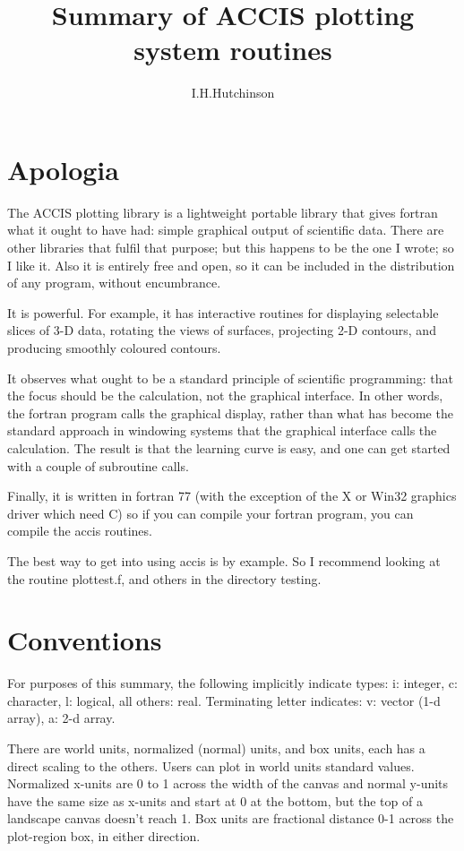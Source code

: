 \documentclass[12pt]{article}
\title{Summary of ACCIS plotting system routines}
\author{I.H.Hutchinson}
\date{}
\begin{document}
\maketitle

\tableofcontents

\section{Apologia}

The ACCIS plotting library is a lightweight portable library that
gives fortran what it ought to have had: simple graphical output of
scientific data. There are other libraries that fulfil that purpose;
but this happens to be the one I wrote; so I like it. Also it is
entirely free and open, so it can be included in the distribution of
any program, without encumbrance. 

It is powerful. For example, it has interactive routines for
displaying selectable slices of 3-D data, rotating the views of
surfaces, projecting 2-D contours, and producing smoothly coloured
contours.

It observes what ought to be a standard principle of scientific
programming: that the focus should be the calculation, not the
graphical interface. In other words, the fortran program calls the
graphical display, rather than what has become the standard approach
in windowing systems that the graphical interface calls the
calculation. The result is that the learning curve is easy, and one
can get started with a couple of subroutine calls.

Finally, it is written in fortran 77 (with the exception of the X or
Win32 graphics driver which need C) so if you can compile your
fortran program, you can compile the accis routines.

The best way to get into using accis is by example. So I recommend
looking at the routine plottest.f, and others in the directory testing.

\section{Conventions}

For purposes of this summary, the following implicitly indicate types:
i: integer, c: character, l: logical, all others: real.  Terminating
letter indicates: v: vector (1-d array), a: 2-d array.  

There are world units, normalized (normal) units, and box units, each
has a direct scaling to the others. Users can plot in world units
standard values. Normalized x-units are 0 to 1 across the width of the
canvas and normal y-units have the same size as x-units and start at 0
at the bottom, but the top of a landscape canvas doesn't reach 1. Box
units are fractional distance 0-1 across the plot-region box, in
either direction.
\end{document}
